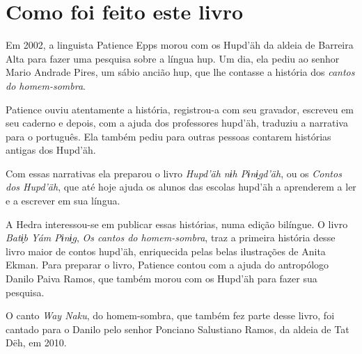 \chapter{Como foi feito este livro}

Em 2002, a linguista Patience Epps morou com os Hupd’äh da aldeia de Barreira Alta para fazer uma pesquisa sobre a língua hup. Um dia, ela pediu ao senhor Mario Andrade Pires, um sábio ancião hup, que lhe contasse a história dos \textit{cantos do homem-sombra}.

Patience ouviu atentamente a história, registrou-a com seu gravador, escreveu em seu caderno e depois, com a ajuda dos professores hupd’äh, traduziu a narrativa para o português. Ela também pediu para outras pessoas contarem histórias antigas dos Hupd’äh.

Com essas narrativas ela preparou o livro \textit{Hupd’äh nɨh Pɨnɨ̗gd’äh}, ou os \textit{Contos dos Hupd’äh}, que até hoje ajuda os alunos das escolas hupd’äh a aprenderem a ler e a escrever em sua língua.

A Hedra interessou-se em publicar essas histórias, numa edição bilíngue. O livro \textit{Batɨ̗b  Yám Pɨnɨ̗g}, \textit{Os cantos do homem-sombra}, traz a primeira história desse livro maior de contos hupd’äh, enriquecida pelas belas ilustrações de Anita Ekman. Para preparar o livro, Patience contou com a ajuda do antropólogo Danilo Paiva Ramos, que também morou com os Hupd’äh para fazer sua pesquisa.

O canto \textit{Way Naku}, do homem-sombra, que também fez parte desse livro, foi cantado
para o Danilo pelo senhor Ponciano Salustiano Ramos, da aldeia de Tat Dëh, em 2010.


